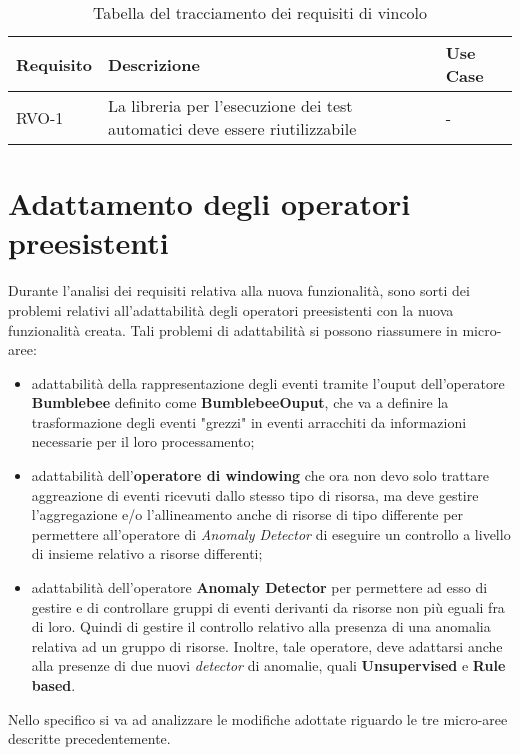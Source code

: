\begin{table}%
\caption{Tabella del tracciamento dei requisiti di vincolo}
\label{tab:requisiti-vincolo}
\begin{tabularx}{\textwidth}{lXl}
\hline\hline
\textbf{Requisito} & \textbf{Descrizione} & \textbf{Use Case}\\
\hline
RVO-1    & La libreria per l'esecuzione dei test automatici deve essere riutilizzabile & - \\
\hline
\end{tabularx}
\end{table}%


\section{Adattamento degli operatori preesistenti}
Durante l'analisi dei requisiti relativa alla nuova funzionalità, sono sorti dei problemi relativi all'adattabilità degli operatori preesistenti con la nuova funzionalità creata. Tali problemi di adattabilità si possono riassumere in micro-aree:

\begin{itemize}
	\item{adattabilità della rappresentazione degli eventi tramite l'ouput dell'operatore \textbf{Bumblebee} definito come \textbf{BumblebeeOuput}, che va a definire la trasformazione degli eventi "grezzi" in eventi arracchiti da informazioni necessarie per il loro processamento;}
	\item{adattabilità dell'\textbf{operatore di windowing} che ora non devo solo trattare aggreazione di eventi ricevuti dallo stesso tipo di risorsa, ma deve gestire l'aggregazione e/o l'allineamento anche di risorse di tipo differente per permettere all'operatore di \textit{Anomaly Detector} di eseguire un controllo a livello di insieme relativo a risorse differenti;}
	\item{adattabilità dell'operatore \textbf{Anomaly Detector} per permettere ad esso di gestire e di controllare gruppi di eventi derivanti da risorse non più eguali fra di loro. Quindi di gestire il controllo relativo alla presenza di una anomalia relativa ad un gruppo di risorse. Inoltre, tale operatore, deve adattarsi anche alla presenze di due nuovi \textit{detector} di anomalie, quali \textbf{Unsupervised} e \textbf{Rule based}.}
\end{itemize}
	
Nello specifico si va ad analizzare le modifiche adottate riguardo le tre micro-aree descritte precedentemente.

